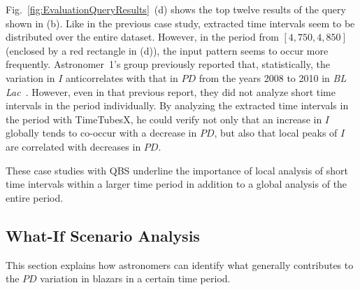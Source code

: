 Fig.~\ref{fig:EvaluationQueryResults}~(d) shows the top twelve results of the query shown in (b).
Like in the previous case study, 
extracted time intervals seem to be distributed over the entire dataset.
However, in the period from $[4{,}750, 4{,}850]$ (enclosed by a red rectangle in (d)), 
the input pattern seems to occur more frequently.
Astronomer~1's group previously reported that, statistically, the variation in $I$ anticorrelates with that in $PD$ from the years 2008 to 2010 in \emph{BL Lac}~\cite{Gaur2014}.
However, even in that previous report, they did not analyze short time intervals in the period individually.
By analyzing the extracted time intervals in the period with TimeTubesX, he could verify not only that an increase in $I$ globally tends to co-occur with a decrease in $PD$, 
but also that local peaks of $I$ are correlated with decreases in $PD$.

These case studies with QBS underline the importance of local analysis of short time intervals within a larger time period in addition to a global analysis of the entire period.

\subsection{What-If Scenario Analysis}\label{sec:whatif}
This section explains how astronomers can identify what generally contributes to the $PD$ variation in blazars in a certain time period. 

